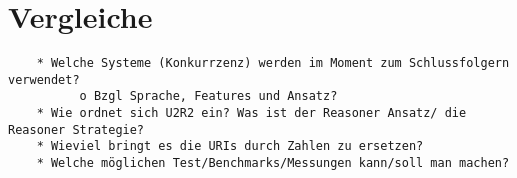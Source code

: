 \chapter{Vergleiche}

\begin{verbatim}
    * Welche Systeme (Konkurrzenz) werden im Moment zum Schlussfolgern verwendet?
          o Bzgl Sprache, Features und Ansatz? 
    * Wie ordnet sich U2R2 ein? Was ist der Reasoner Ansatz/ die Reasoner Strategie?
    * Wieviel bringt es die URIs durch Zahlen zu ersetzen?
    * Welche möglichen Test/Benchmarks/Messungen kann/soll man machen? 
\end{verbatim}
